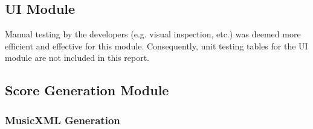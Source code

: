 \documentclass[12pt, titlepage]{article}
\begin{document}
\subsection{UI Module}
Manual testing by the developers (e.g. visual inspection, etc.) was deemed more efficient and effective for this module. Consequently, unit testing tables for the UI 
module are not included in this report.\\

\subsection{Score Generation Module}
\subsubsection{MusicXML Generation}
\end{document}
